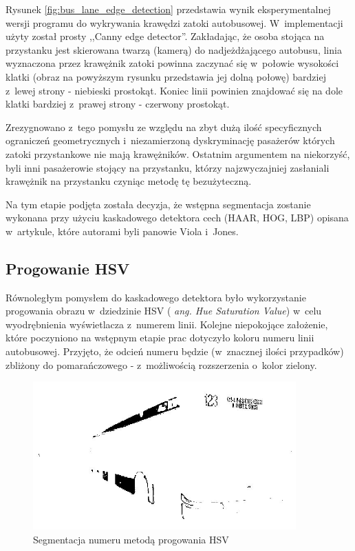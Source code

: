 Rysunek \ref{fig:bus_lane_edge_detection} przedstawia wynik 
eksperymentalnej wersji programu do
wykrywania krawędzi zatoki autobusowej. W~implementacji użyty
został prosty ,,Canny edge detector''. Zakładając, że osoba stojąca
na przystanku jest skierowana twarzą (kamerą) do nadjeżdżającego autobusu,
linia wyznaczona przez krawężnik zatoki powinna zaczynać się w~połowie
wysokości klatki (obraz na powyższym rysunku przedstawia jej dolną
połowę) bardziej z~lewej strony - niebieski prostokąt. Koniec linii
powinien znajdować się na dole klatki bardziej z~prawej strony - czerwony
prostokąt.

Zrezygnowano z~tego pomysłu ze względu na zbyt dużą ilość 
specyficznych
ograniczeń geometrycznych i~niezamierzoną dyskryminację pasażerów
których zatoki przystankowe nie mają krawężników. Ostatnim argumentem
na niekorzyść, 
byli inni pasażerowie stojący na przystanku, którzy najzwyczajniej
zasłaniali krawężnik na przystanku czyniąc metodę tę bezużyteczną.

Na tym etapie podjęta została decyzja, że wstępna segmentacja
zostanie wykonana przy użyciu kaskadowego detektora cech (HAAR, HOG, LBP)
opisana w~artykule, które autorami byli panowie Viola i~Jones.

\subsection{Progowanie HSV}

Równoległym pomysłem do kaskadowego detektora było 
wykorzystanie progowania obrazu w~dziedzinie HSV (\textit{
ang. Hue Saturation Value})
w~celu wyodrębnienia wyświetlacza z~numerem linii. 
Kolejne niepokojące założenie, które poczyniono
na wstępnym etapie prac dotyczyło koloru numeru linii autobusowej.
Przyjęto, że odcień numeru będzie (w~znacznej ilości przypadków) 
zbliżony do pomarańczowego - z~możliwością rozszerzenia o~kolor
zielony. 

\begin{figure}[h!]
    \caption{Segmentacja numeru metodą progowania HSV}
    \centering
    \includegraphics[width=0.9\textwidth]{img/exp_hsv_threshold_number_detector}
\end{figure}

